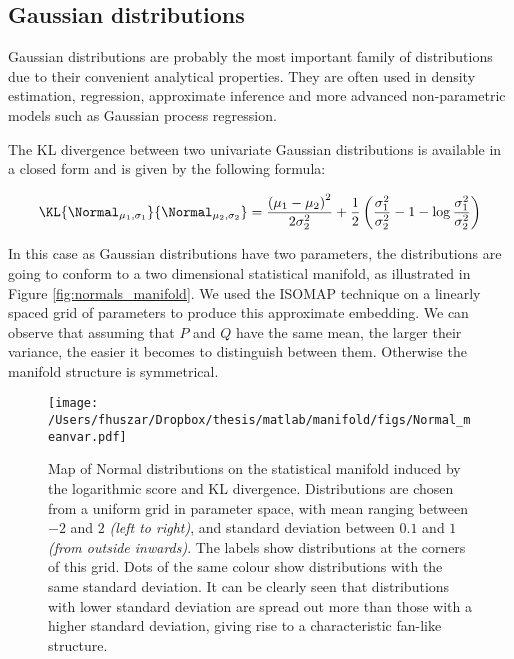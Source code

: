 \subsection{Gaussian distributions}

Gaussian distributions are probably the most important family of distributions due to their convenient analytical properties. They are often used in density estimation, regression, approximate inference and more advanced non-parametric models such as Gaussian process regression.

The KL divergence between two univariate Gaussian distributions is available in a closed form and is given by the following formula:

\begin{equation}
	\KL{\Normal_{\mu_1,\sigma_1}}{\Normal_{\mu_2,\sigma_2}} = \frac{\left(\mu_1 - \mu_2\right)^2}{2\sigma_2^2} + \frac{1}{2}\left(\frac{\sigma_1^2}{\sigma_2^2} - 1 - \log\frac{\sigma_1^2}{\sigma_2^2}\right)
\end{equation}

In this case as Gaussian distributions have two parameters, the distributions are going to conform to a two dimensional statistical manifold, as illustrated in Figure \ref{fig:normals_manifold}. We used the ISOMAP technique on a linearly spaced grid of parameters to produce this approximate embedding. We can observe that assuming that $P$ and $Q$ have the same mean, the larger their variance, the easier it becomes to distinguish between them. Otherwise the manifold structure is symmetrical.

\begin{figure} %
	\begin{center}
	\texttt{[image: /Users/fhuszar/Dropbox/thesis/matlab/manifold/figs/Normal\_meanvar.pdf]}
	\end{center}
	\caption{Map of Normal distributions on the statistical manifold induced by the logarithmic score and KL divergence. Distributions are chosen from a uniform grid in parameter space, with mean ranging between $-2$ and $2$ \emph{(left to right)}, and standard deviation between $0.1$ and $1$ \emph{(from outside inwards)}. The labels show distributions at the corners of this grid.  Dots of the same colour show distributions with the same standard deviation. It can be clearly seen that distributions with lower standard deviation are spread out more than those with a higher standard deviation, giving rise to a characteristic fan-like structure.}
	\label{fig:Normal_meanvar}
\end{figure}

